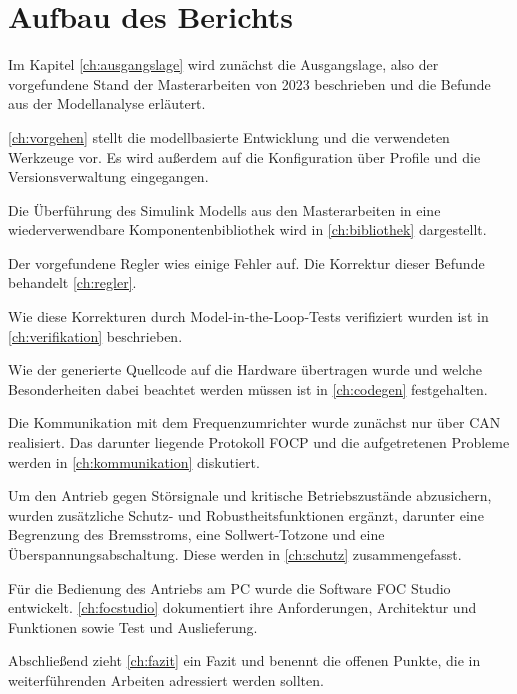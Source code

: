 \section{Aufbau des Berichts}
Im Kapitel \ref{ch:ausgangslage} wird zunächst die Ausgangslage, also der vorgefundene Stand der Masterarbeiten von 2023 beschrieben und die Befunde aus der Modellanalyse erläutert.

\ref{ch:vorgehen} stellt die modellbasierte Entwicklung und die verwendeten Werkzeuge vor. Es wird außerdem auf die Konfiguration über Profile und die Versionsverwaltung eingegangen.

Die Überführung des Simulink Modells aus den Masterarbeiten in eine wiederverwendbare Komponentenbibliothek wird in \ref{ch:bibliothek} dargestellt.

Der vorgefundene Regler wies einige Fehler auf. Die Korrektur dieser Befunde behandelt \ref{ch:regler}.

Wie diese Korrekturen durch Model-in-the-Loop-Tests verifiziert wurden ist in \ref{ch:verifikation} beschrieben.

Wie der generierte Quellcode auf die Hardware übertragen wurde und welche Besonderheiten dabei beachtet werden müssen ist in \ref{ch:codegen} festgehalten.

Die Kommunikation mit dem Frequenzumrichter wurde zunächst nur über \ac{CAN} realisiert. Das darunter liegende Protokoll \ac{FOCP} und die aufgetretenen Probleme werden in \ref{ch:kommunikation} diskutiert.

Um den Antrieb gegen Störsignale und kritische Betriebszustände abzusichern, wurden zusätzliche Schutz- und Robustheitsfunktionen ergänzt, darunter eine Begrenzung des Bremsstroms, eine Sollwert-Totzone und eine Überspannungsabschaltung. Diese werden in \ref{ch:schutz} zusammengefasst.

Für die Bedienung des Antriebs am PC wurde die Software FOC Studio entwickelt. \ref{ch:focstudio} dokumentiert ihre Anforderungen, Architektur und Funktionen sowie Test und Auslieferung.

Abschließend zieht \ref{ch:fazit} ein Fazit und benennt die offenen Punkte, die in weiterführenden Arbeiten adressiert werden sollten.
